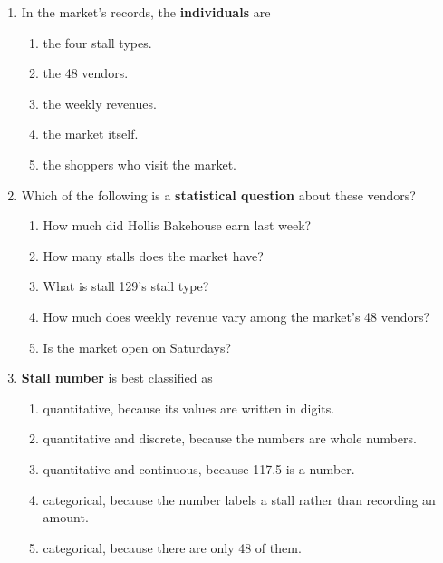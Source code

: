 \documentclass[12pt]{article}
\newcommand{\letterroom}{\rule[-15pt]{0pt}{36pt}}
\begin{document}
\vspace{0.10in}

\begin{enumerate}[leftmargin=1.9em, itemsep=0.13in]

  \boxguard[9]
  \item In the market's records, the \textbf{individuals} are
        \begin{enumerate}[label=\textbf{(\Alph*)}, leftmargin=2.2em, itemsep=2pt]
          \item the four stall types.
          \item the 48 vendors.
          \item the weekly revenues.
          \item the market itself.
          \item the shoppers who visit the market.
                \hfill{}\letterroom
        \end{enumerate}

  \boxguard[9]
  \item Which of the following is a \textbf{statistical question} about these vendors?
        \begin{enumerate}[label=\textbf{(\Alph*)}, leftmargin=2.2em, itemsep=2pt]
          \item How much did Hollis Bakehouse earn last week?
          \item How many stalls does the market have?
          \item What is stall 129's stall type?
          \item How much does weekly revenue vary among the market's 48 vendors?
          \item Is the market open on Saturdays?
                \hfill{}\letterroom
        \end{enumerate}

  \boxguard[9]
  \item \textbf{Stall number} is best classified as
        \begin{enumerate}[label=\textbf{(\Alph*)}, leftmargin=2.2em, itemsep=2pt]
          \item quantitative, because its values are written in digits.
          \item quantitative and discrete, because the numbers are whole numbers.
          \item quantitative and continuous, because 117.5 is a number.
          \item categorical, because the number labels a stall rather than recording an amount.
          \item categorical, because there are only 48 of them.
                \hfill{}\letterroom
        \end{enumerate}


\end{enumerate}
\end{document}
